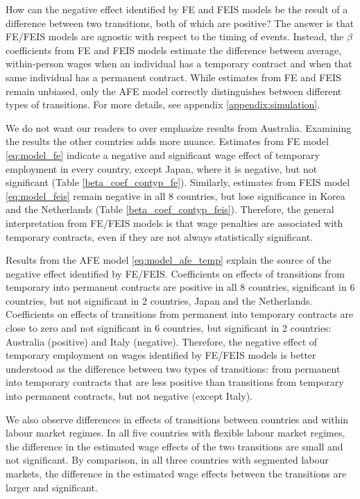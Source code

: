 \documentclass[12pt]{article}
\begin{document}
How can the negative effect identified by FE and FEIS models be the result of a difference between two transitions, both of which are positive?  The answer is that FE/FEIS models are agnostic with respect to the timing of events.  Instead, the $\beta$ coefficients from FE and FEIS models estimate the difference between average, within-person wages when an individual has a temporary contract and when that same individual has a permanent contract.  While estimates from FE and FEIS remain unbiased, only the AFE model correctly distinguishes between different types of transitions.  For more details, see appendix \ref{appendix:simulation}.

We do not want our readers to over emphasize results from Australia.  Examining the results the other countries adds more nuance.  Estimates from FE model \ref{eq:model_fe} indicate a negative and significant wage effect of temporary employment in every country, except Japan, where it is negative, but not significant (Table \ref{beta_coef_contyp_fe}).  Similarly, estimates from FEIS model \ref{eq:model_feis} remain negative in all 8 countries, but lose significance in Korea and the Netherlands (Table \ref{beta_coef_contyp_feis}).  Therefore, the general interpretation from FE/FEIS models is that wage penalties are associated with temporary contracts, even if they are not always statistically significant.  

Results from the AFE model \ref{eq:model_afe_temp} explain the source of the negative effect identified by FE/FEIS.  Coefficients on effects of transitions from temporary into permanent contracts are positive in all 8 countries, significant in 6 countries, but not significant in 2 countries, Japan and the Netherlands.  Coefficients on effects of transitions from permanent into temporary contracts are close to zero and not significant in 6 countries, but significant in 2 countries: Australia (positive) and Italy (negative).  Therefore, the negative effect of temporary employment on wages identified by FE/FEIS models is better understood as the difference between two types of transitions: from permanent into temporary contracts that are less positive than transitions from temporary into permanent contracts, but not negative (except Italy).  

We also observe differences in effects of transitions between countries and within labour market regimes.  In all five countries with flexible labour market regimes, the difference in the estimated wage effects of the two transitions are small and not significant.  By comparison, in all three countries with segmented labour markets, the difference in the estimated wage effects between the transitions are larger and significant.  
\end{document}
